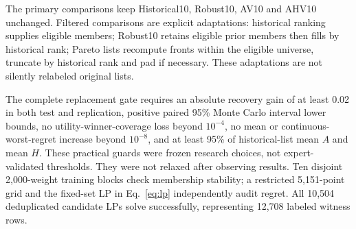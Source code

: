 \documentclass{llncs}
\begin{document}
The primary comparisons keep Historical10, Robust10, AV10 and AHV10 unchanged. Filtered comparisons are explicit adaptations: historical ranking supplies eligible members; Robust10 retains eligible prior members then fills by historical rank; Pareto lists recompute fronts within the eligible universe, truncate by historical rank and pad if necessary. These adaptations are not silently relabeled original lists.

The complete replacement gate requires an absolute recovery gain of at least 0.02 in both test and replication, positive paired 95\% Monte Carlo interval lower bounds, no utility-winner-coverage loss beyond $10^{-4}$, no mean or continuous-worst-regret increase beyond $10^{-8}$, and at least 95\% of historical-list mean $A$ and mean $H$. These practical guards were frozen research choices, not expert-validated thresholds. They were not relaxed after observing results. Ten disjoint 2,000-weight training blocks check membership stability; a restricted 5,151-point grid and the fixed-set LP in Eq.~\ref{eq:lp} independently audit regret. All 10,504 deduplicated candidate LPs solve successfully, representing 12,708 labeled witness rows.
\end{document}
